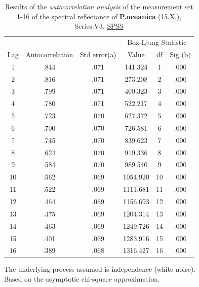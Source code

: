 \documentclass[10pt, a4paper]{article}
\begin{document}
\begin{appendices}
\begin{table}[htbp]
	\caption{Results of the \textit{autocorrelation analysis} of the measurement set 1-16 of the spectral reflectance of \textbf{P.oceanica} (15.X.), Series:V3. \href{http://www.spss.com/}{SPSS}}
	\begin{center}
	\begin{tabular}{|c|c|c|c|c|c|}
		\hline\hline
		& & & \multicolumn{3}{c|}{Box-Ljung Statistic}\\
		\cline{4-6}
			Lag & Autocorrelation & Std error(a) & Value & df & Sig (b)\\ \hline\hline
			1 & .844 & .071 & 141.324 & 1 & .000 \\ \hline
			2 & .816 & .071 & 273.208 & 2 & .000 \\ \hline
			3 & .799 & .071 & 400.323 & 3 & .000 \\ \hline
			4 & .780 & .071 & 522.217 & 4 & .000 \\ \hline
			5 & .723 & .070 & 627.372 & 5 & .000 \\ \hline
			6 & .700 & .070 & 726.581 & 6 & .000 \\ \hline
			7 & .745 & .070 & 839.623 & 7 & .000 \\ \hline
			8 & .624 & .070 & 919.336 & 8 & .000 \\ \hline
			9 & .584 & .070 & 989.540 & 9 & .000 \\ \hline
			10 & .562 & .069 & 1054.920 & 10 & .000 \\ \hline
			11 & .522 & .069 & 1111.681 & 11 & .000 \\ \hline
			12& .464 & .069 & 1156.693 & 12 & .000 \\ \hline
			13 & .475 & .069 & 1204.314 & 13 & .000 \\ \hline
			14 & .463 & .069 & 1249.726 & 14 & .000 \\ \hline
			15 & .401 & .069 & 1283.916 & 15 & .000 \\ \hline
			16 & .389 & .068 & 1316.427 & 16 & .000 \\ \hline
	\end{tabular}
	\end{center}
	The underlying process assumed is independence (white noise).\\
	Based on the asymptotic chi-square approximation.
	\label{tab:13}
\end{table}


\end{appendices}
\end{document}
